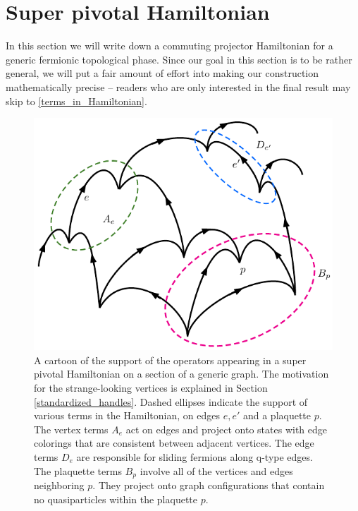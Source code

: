 


 \section{Super pivotal Hamiltonian}
 \label{Super_pivotal_Hamiltonian}

In this section we will write down a commuting projector Hamiltonian 
for a generic fermionic topological phase. 
Since our goal in this section is to be rather general, we will put a fair amount of effort into making our construction 
mathematically precise -- readers who are only interested in the final result may skip to \ref{terms_in_Hamiltonian}. 

 \begin{figure}
\begin{center}
  \includegraphics{sample_lattice.pdf}
 \caption{A cartoon of the support of the operators appearing in a super pivotal Hamiltonian on a section of a generic graph. 
The motivation for the strange-looking vertices is explained in Section \ref{standardized_handles}.
Dashed ellipses indicate the support of various terms in the Hamiltonian, on edges $e,e'$ and a plaquette $p$.
The vertex terms $A_e$ act on edges and project onto states with edge colorings that are consistent between adjacent vertices. 
The edge terms $D_e$ are responsible for sliding fermions along q-type edges. 
The plaquette terms $B_p$ involve all of the vertices and edges neighboring $p$.
They project onto graph configurations that contain no quasiparticles within the plaquette $p$.
}
 \label{example_lattice}
 \end{center}
 \end{figure}

